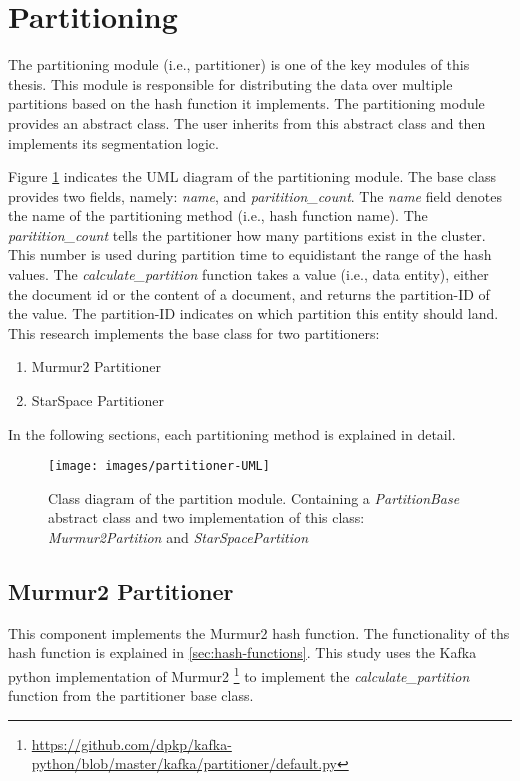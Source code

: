 \section{Partitioning}
\label{sec:partitioning}
The partitioning module (i.e., partitioner) is one of the key modules of this thesis. This module is responsible for distributing the data over multiple partitions based on the hash function it implements. The partitioning module provides an abstract class. The user inherits from this abstract class and then implements its segmentation logic. 


Figure \ref{fig:partitioner-uml} indicates the UML diagram of the partitioning module. The base class provides two fields, namely: \emph{name}, and \emph{paritition\_count}. The \emph{name} field denotes the name of the partitioning method (i.e., hash function name). The \emph{paritition\_count} tells the partitioner how many partitions exist in the cluster. This number is used during partition time to equidistant the range of the hash values. The \emph{calculate\_partition} function takes a value (i.e., data entity), either the document id or the content of a document, and returns the partition-ID of the value. The partition-ID indicates on which partition this entity should land. This research implements the base class for two partitioners:

\begin{enumerate}
    \item Murmur2 Partitioner
    \item StarSpace Partitioner
\end{enumerate}

\noindent In the following sections, each partitioning method is explained in detail.

\begin{figure}[!ht]
    \centering
    \texttt{[image: images/partitioner-UML]}
    \caption{Class diagram of the partition module. Containing a \emph{PartitionBase} abstract class and two implementation of this class: \emph{Murmur2Partition} and \emph{StarSpacePartition}}
    \label{fig:partitioner-uml}
\end{figure}


\subsection{Murmur2 Partitioner}
\label{subsec:partitioning-murmur2}
This component implements the Murmur2 hash function. The functionality of ths hash function is explained in \ref{sec:hash-functions}. This study uses the Kafka python implementation of Murmur2 \footnote{\url{https://github.com/dpkp/kafka-python/blob/master/kafka/partitioner/default.py}} to implement the \emph{calculate\_partition} function from the partitioner base class.

